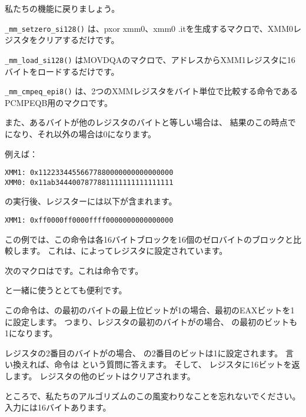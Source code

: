 私たちの機能に戻りましょう。

\verb|_mm_setzero_si128()| は、pxor xmm0、xmm0 .itを生成するマクロで、XMM0レジスタをクリアするだけです。

\verb|_mm_load_si128()| はMOVDQAのマクロで、アドレスからXMM1レジスタに16バイトをロードするだけです。

\verb|_mm_cmpeq_epi8()| は、2つのXMMレジスタをバイト単位で比較する命令であるPCMPEQB用のマクロです。

また、あるバイトが他のレジスタのバイトと等しい場合は、
結果のこの時点でになり、それ以外の場合は0になります。

例えば：

\begin{verbatim}
XMM1: 0x11223344556677880000000000000000
XMM0: 0x11ab3444007877881111111111111111
\end{verbatim}

の実行後、レジスターには以下が含まれます。

\begin{verbatim}
XMM1: 0xff0000ff0000ffff0000000000000000
\end{verbatim}

この例では、この命令は各16バイトブロックを16個のゼロバイトのブロックと比較します。
これは、によってレジスタに設定されています。


次のマクロはです。これは命令です。

\PCMPEQB と一緒に使うととても便利です。


この命令は、の最初のバイトの最上位ビットが1の場合、最初のEAXビットを1に設定します。
つまり、レジスタの最初のバイトがの場合、 \EAX の最初のビットも1になります。

レジスタの2番目のバイトがの場合、 \EAX の2番目のビットは1に設定されます。
言い換えれば、命令は
という質問に答えます。
そして、 \EAX レジスタに16ビットを返します。 
\EAX レジスタの他のビットはクリアされます。

ところで、私たちのアルゴリズムのこの風変わりなことを忘れないでください。
入力には16バイトあります。



